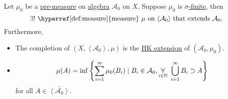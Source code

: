 \begin{corollary}
	Let \(\mu _0\) be a \hyperref[def:pre-measure]{pre-measure} on \hyperref[def:algebra]{algebra} \(\mathcal{A} _0\) on \(X\). Suppose \(\mu _0\) is \hyperref[def:finite-measure]{\(\sigma \)-finite}, then
	\[
		\exists! \text{ \hyperref[def:measure]{measure} \(\mu\) on \(\left< \mathcal{A} _0 \right> \) that extends \(\mathcal{A} _0\)}.
	\]
	Furthermore,
	\begin{itemize}
		\item The completion of \((X, \left< \mathcal{A} _0 \right>, \mu  )\) is the \hyperref[def:HK-extension]{HK extension} of \((\mathcal{A} _0, \mu _0)\).
		\item
		      \[
			      \mu (A) = \inf\left\{\sum\limits_{i=1}^{\infty} \mu _0(B_{i})\mid B_{i}\in \mathcal{A} _0, \underset{i\in\mathbb{\MakeUppercase{N}} }{\forall}\ \bigcup\limits_{i=1}^{\infty} B_{i}\supset A\right\}
		      \]
		      for all \(A\in \bar{\left< \mathcal{A} _0 \right> }\).
	\end{itemize}
\end{corollary}